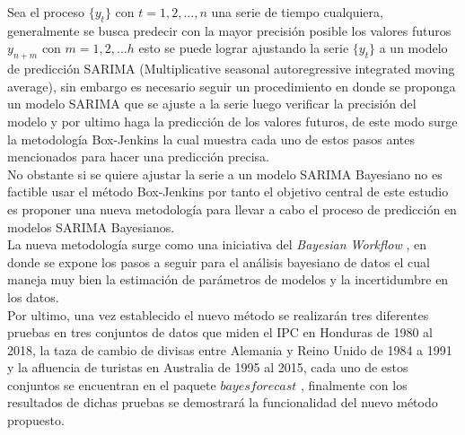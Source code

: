 \documentclass[peerreview]{IEEEtran}
\begin{document}
Sea el proceso $\{y_t\}$ con $t=1,2,...,n$ una serie de tiempo cualquiera, generalmente se busca predecir con la mayor precisión posible los valores futuros $y_{n+m}$ con $m=1,2,...h$ esto se puede lograr ajustando la serie $\{y_t\}$ a un modelo de predicción SARIMA (Multiplicative seasonal autoregressive integrated moving average), sin embargo es necesario seguir un procedimiento en donde se proponga un modelo SARIMA que se ajuste a la serie luego verificar la precisión del modelo y por ultimo haga la predicción de los valores futuros, de este modo surge la metodología Box-Jenkins la cual muestra cada uno de estos pasos antes mencionados para hacer una predicción precisa.\\
No obstante si se quiere ajustar la serie a un modelo SARIMA Bayesiano no es factible usar el método Box-Jenkins por tanto el objetivo central de este estudio es proponer una nueva metodología para llevar a cabo el proceso de predicción en modelos SARIMA Bayesianos.\\
La nueva metodología surge como una iniciativa del \textit{Bayesian Workflow} \cite{Aki}, en donde se expone los pasos a seguir para el análisis bayesiano de datos el cual maneja muy bien la estimación de parámetros de modelos y la incertidumbre en los datos.\\
Por ultimo, una vez establecido el nuevo método se realizarán tres diferentes pruebas en tres conjuntos de datos que miden el IPC en Honduras de 1980 al 2018, la taza de cambio de divisas entre Alemania y Reino Unido de 1984 a 1991 y la afluencia de turistas en Australia de 1995 al 2015, cada uno de estos conjuntos se encuentran en el paquete $\textit{bayesforecast}$ \cite{bayesforecast}, finalmente con los resultados de dichas pruebas se demostrará la funcionalidad del nuevo método propuesto.
\end{document}
